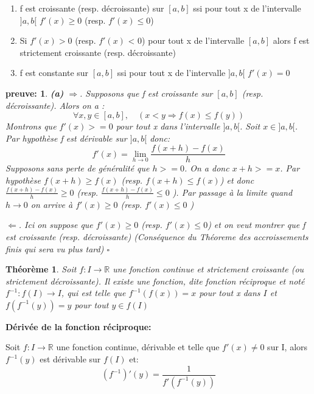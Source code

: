 \documentclass[a4paper]{article}
\theoremstyle{break}
\newtheorem{theo}{Théorème}[section]
\newtheorem*{Proof}{preuve:}
\newcommand{\R}{\mathbb{R}}
\begin{document}
\begin{enumerate}[label=(\alph*), leftmargin =2cm]
\item f est croissante (resp. décroissante) sur $[a,b]$ ssi pour tout
  x de l'intervalle $]a,b[$ $f'(x) \geq 0$ (resp. $f'(x) \leq 0$)
\item Si $f'(x) > 0$ (resp. $f'(x)$ < 0) pour tout x de l'intervalle
  $[a,b]$  alors f est strictement croissante (resp. décroissante)
\item f est constante sur $[a,b]$ ssi pour tout x de l'intervalle
  $]a,b[$ $f'(x) = 0$
\end{enumerate}

\begin{Proof}
  \textbf{(a)} $\Rightarrow$. Supposons que f est croissante sur
  $[a,b]$ (resp. décroissante). Alors on a :
  \[
    \forall x,y \in [a,b], \quad (x<y \Rightarrow f(x) \leq f(y) )
  \]
  Montrons que $f'(x)>=0$ pour tout x dans l'intervalle $]a,b[$. Soit
  $x \in ]a,b[$. Par hypothèse f est dérivable sur $]a,b[$ donc:
  \[
    f'(x) = \lim \limits_{h \to 0} \frac{f(x+h) - f(x)}{h}
  \]
  Supposons sans perte de généralité que $h>=0$. On a donc $x+h >=
  x$. Par hypothèse $f(x+h) \geq f(x)$ (resp. $f(x+h) \leq f(x)$) et
  donc $\frac{f(x+h) -f(x)}{h} \geq 0$ (resp. $\frac{f(x+h) -f(x)}{h}
  \leq 0$ ). Par passage à la limite quand $h\to 0$ on arrive à $f'(x)
  \geq 0$ (resp. $f'(x) \leq 0$ )

  \vspace{1\baselineskip}
  
  $\Leftarrow$. Ici on suppose que $f'(x) \geq 0$ (resp. $f'(x) \leq
  0$) et on veut montrer que f est croissante (resp. décroissante)
  (Conséquence du Théoreme des accroissements finis qui sera vu plus
  tard) $\square$
\end{Proof}

\begin{theo}
  Soit $f: I \to \R$ une fonction continue et strictement croissante
  (ou strictement décroissante).
  \newline
  Il existe une fonction, dite fonction réciproque et noté
  $f^{-1}: f(I) \to I$, qui est telle que $f^{-1}(f(x)) = x $ pour
  tout x dans $I$ et $f(f^{-1}(y)) = y$ pour tout  $y \in f(I)$
\end{theo}

\textbf{Dérivée de la fonction réciproque: }

Soit $f: I \to \R$ une fonction continue, dérivable et telle que
$f'(x) \neq 0$ sur I, alors $f^{-1}(y)$ est dérivable sur $f(I)$ et:
\[
  (f^{-1})'(y) = \frac{1}{f'(f^{-1}(y))}
\]
\end{document}

